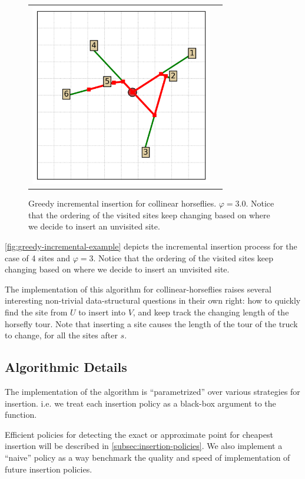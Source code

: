 \documentclass[11.5pt]{report}
\begin{document}
\begin{figure}[H]
\begin{tabular}{cc}
\includegraphics[width=8cm]{../webs/docs/algo-greedy-incremental-insertion---Day-2018-12-24_ClockTime-19:31:02/algo_state_00005.png}\\
\end{tabular}
\caption{Greedy incremental insertion for collinear horseflies. $\varphi=3.0$. Notice that 
the ordering of the visited sites keep changing based on where we decide to insert an 
unvisited site.}
\label{fig:greedy-incremental-example}
\end{figure}


\autoref{fig:greedy-incremental-example} depicts the incremental insertion process for 
the case of 4 sites and $\varphi=3$. Notice that the ordering of the visited sites keep 
changing based on where we decide to insert an unvisited site. 

The implementation of this algorithm for collinear-horseflies raises several interesting non-trivial 
data-structural questions in their own right: how to quickly find the site from $U$ to 
insert into $V$, and keep track the changing length of the horsefly tour. Note that inserting a site 
causes the length of the tour of the truck to change, for all the sites after $s$. 
 
\subsection*{Algorithmic Details}
\newchunk The implementation of the algorithm is ``parametrized'' over various strategies for insertion. 
i.e. we treat each insertion policy as a black-box argument to the function.
 
Efficient policies for detecting the exact or approximate point for cheapest insertion will be 
described in \autoref{subsec:insertion-policies}.  We also implement a ``naive'' policy as a way 
benchmark the quality and speed of implementation of future insertion policies. 
\end{document}

